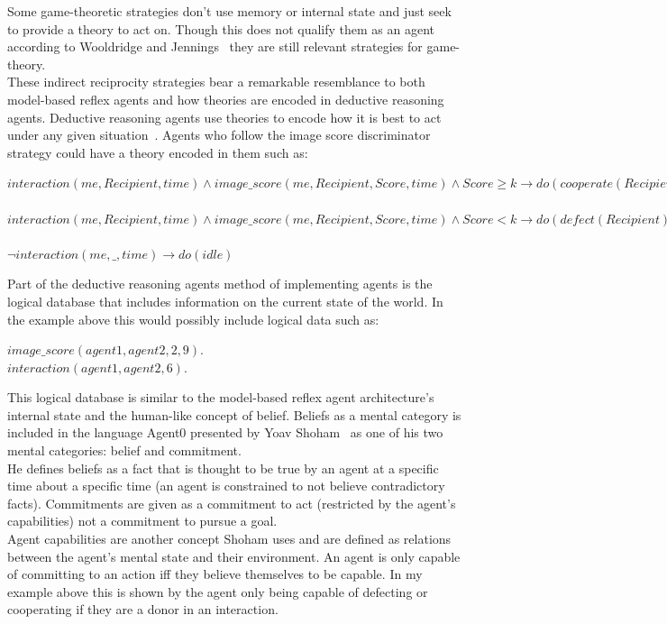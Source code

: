 \documentclass[twoside,twocolumn]{article}
\begin{document}
Some game-theoretic strategies don't use memory or internal state and just seek to provide a theory to act on. Though this does not qualify them as an agent according to Wooldridge and Jennings~\cite{wooldridge_jennings_1995} they are still relevant strategies for game-theory.\\
These indirect reciprocity strategies bear a remarkable resemblance to both model-based reflex agents and how theories are encoded in deductive reasoning agents. Deductive reasoning agents use theories to encode how it is best to act under any given situation~\cite{kostas_deductive}. Agents who follow the image score discriminator strategy could have a theory encoded in them such as:
\begin{framed}
\noindent$interaction(me, Recipient, time) \wedge image\_score(me, Recipient, Score, time) \wedge Score\geq k \to do(cooperate(Recipient))$\\\\
$interaction(me, Recipient, time) \wedge image\_score(me, Recipient, Score, time) \wedge Score<k \to do(defect(Recipient))$\\\\
$\neg interaction(me, \_, time) \to do(idle)$
\end{framed}
\noindent Part of the deductive reasoning agents method of implementing agents is the logical database that includes information on the current state of the world. In the example above this would possibly include logical data such as:
\begin{framed}
\begin{center}
$image\_score(agent1, agent2, 2, 9).$ \\
$interaction(agent1, agent2, 6).$
\end{center}
\end{framed}
\noindent This logical database is similar to the model-based reflex agent architecture's internal state and the human-like concept of belief. Beliefs as a mental category is included in the language Agent0 presented by Yoav Shoham~\cite{shoham1991agent0} as one of his two mental categories: belief and commitment.\\
He defines beliefs as a fact that is thought to be true by an agent at a specific time about a specific time (an agent is constrained to not believe contradictory facts). Commitments are given as a commitment to act (restricted by the agent's capabilities) not a commitment to pursue a goal.\\
Agent capabilities are another concept Shoham uses and are defined as relations between the agent's mental state and their environment. An agent is only capable of committing to an action iff they believe themselves to be capable. In my example above this is shown by the agent only being capable of defecting or cooperating if they are a donor in an interaction.\\
\end{document}
